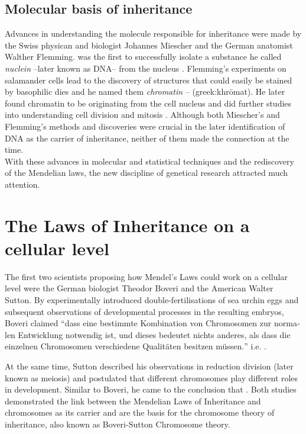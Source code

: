 \subsection{Molecular basis of inheritance}
Advances in understanding the molecule responsible for inheritance were made by the Swiss physican and biologist Johannes Miescher and the German anatomist Walther Flemming.  \citet{Miescher1871} was the first to successfully isolate a substance he called \textit{nuclein} --later known as DNA-- from the nucleus . Flemming's experiments on salamander cells lead to the discovery of structures that could easily be stained by basophilic dies and he named them \textit{chromatin} --   (greek:khrōmat). He later found chromatin to be originating from the cell nucleus and did further studies into understanding cell division and mitosis \parencite*{Flemming1878}. Although both Miescher's and Flemming's methods and discoveries were crucial in the later identification of DNA as the carrier of inheritance, neither of them made the connection at the time. 
\\
With these advances in molecular and statistical techniques and the rediscovery of the Mendelian laws, the new discipline of genetical research attracted much attention. 

\section{The Laws of Inheritance on a cellular level}
The first two scientists proposing how Mendel's Laws could work on a cellular level were the German biologist Theodor Boveri and the American Walter Sutton. By experimentally introduced double-fertilisations of sea urchin eggs and subsequent observations of developmental processes in the resulting embryos, Boveri claimed \foreignquote{german}{dass eine bestimmte Kombination von Chromosomen zur normalen Entwicklung notwendig ist, und dieses bedeutet nichts anderes, als dass die einzelnen Chromosomen verschiedene Qualit\"{a}ten besitzen m\"{u}ssen.}  i.e.  \citep{Boveri1902}. 

At the same time, Sutton described his observations in reduction division (later known as meiosis) and postulated that different chromosomes play different roles in development. Similar to Boveri, he came to the conclusion that  \parencite*{Sutton1903}. Both studies demonstrated the link between the Mendelian Laws of Inheritance and chromosomes as its carrier and are the basis for the chromosome theory of inheritance, also known as Boveri-Sutton Chromosome theory. 


